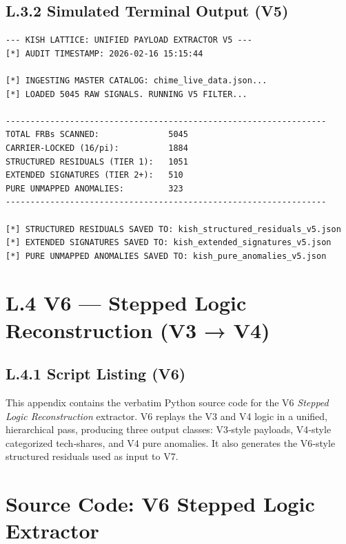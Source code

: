 \documentclass[11pt, letterpaper, openany]{book}
\begin{document}
\subsection*{L.3.2 Simulated Terminal Output (V5)}
\begin{lstlisting}[style=terminal]
--- KISH LATTICE: UNIFIED PAYLOAD EXTRACTOR V5 ---
[*] AUDIT TIMESTAMP: 2026-02-16 15:15:44

[*] INGESTING MASTER CATALOG: chime_live_data.json...
[*] LOADED 5045 RAW SIGNALS. RUNNING V5 FILTER...

-----------------------------------------------------------------
TOTAL FRBs SCANNED:              5045
CARRIER-LOCKED (16/pi):          1884
STRUCTURED RESIDUALS (TIER 1):   1051
EXTENDED SIGNATURES (TIER 2+):   510
PURE UNMAPPED ANOMALIES:         323
-----------------------------------------------------------------

[*] STRUCTURED RESIDUALS SAVED TO: kish_structured_residuals_v5.json
[*] EXTENDED SIGNATURES SAVED TO: kish_extended_signatures_v5.json
[*] PURE UNMAPPED ANOMALIES SAVED TO: kish_pure_anomalies_v5.json
\end{lstlisting}

\section*{L.4 V6 — Stepped Logic Reconstruction (V3 → V4)}

\subsection*{L.4.1 Script Listing (V6)}
This appendix contains the verbatim Python source code for the V6
\textit{Stepped Logic Reconstruction} extractor.  
V6 replays the V3 and V4 logic in a unified, hierarchical pass, producing
three output classes: V3‑style payloads, V4‑style categorized tech‑shares,
and V4 pure anomalies.  
It also generates the V6‑style structured residuals used as input to V7.

\section*{Source Code: V6 Stepped Logic Extractor}
\end{document}
